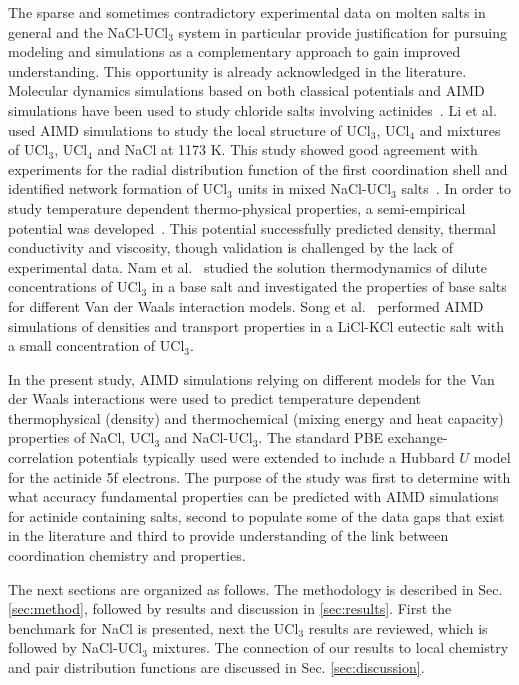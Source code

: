 \documentclass[titlepage=firstiscover,11pt,fleqn,headheight=14pt,footheight=40.8pt]{scrreprt}
\begin{document}
The sparse and sometimes contradictory experimental data on molten salts in general and the NaCl-UCl$_3$ system in particular provide justification for pursuing modeling and simulations as a complementary approach to gain improved understanding. This opportunity is already acknowledged  in the literature. Molecular dynamics simulations based on both classical potentials and AIMD simulations have been used to study chloride salts involving actinides~\cite{Li,Li2020,Nam2015,SONG}. Li et al.~\cite{Li} used AIMD simulations to study the local structure of UCl$_3$, UCl$_4$ and mixtures of UCl$_3$, UCl$_4$ and NaCl at 1173 K. This study showed good agreement with experiments for the radial distribution function of the first coordination shell and identified network formation of UCl$_3$ units in mixed NaCl-UCl$_3$ salts~\cite{Li}. %
In order to study temperature dependent thermo-physical properties, a semi-empirical potential was developed~\cite{Li2020}. This potential successfully predicted density, thermal conductivity and viscosity, though validation is challenged by the lack of experimental data. Nam et al.~\cite{Nam2015} studied the solution thermodynamics of dilute concentrations of UCl$_3$ in a base salt and investigated the properties of base salts for different Van der Waals interaction models. Song et al.~\cite{SONG} performed AIMD simulations of densities and transport properties in a LiCl-KCl eutectic salt with a small concentration of UCl$_3$. 

In the present study, AIMD simulations relying on different models for the Van der Waals interactions were used to predict temperature dependent thermophysical (density) and thermochemical (mixing energy and heat capacity) properties of NaCl, UCl$_3$ and NaCl-UCl$_3$. The standard PBE exchange-correlation potentials typically used were extended to include a Hubbard $U$ model for the actinide 5f electrons. The purpose of the study was first to determine with what accuracy fundamental properties can be predicted with AIMD simulations for actinide containing salts, second to populate some of the data gaps that exist in the literature and third to provide understanding of the link between coordination chemistry and properties. 

The next sections are organized as follows. The methodology is described in Sec. \ref{sec:method}, followed by results and discussion in \ref{sec:results}. First the benchmark for NaCl is presented, next the UCl$_3$ results are reviewed, which is followed by NaCl-UCl$_3$ mixtures. The connection of our results to local chemistry and pair distribution functions are discussed in Sec. \ref{sec:discussion}. %
\end{document}
